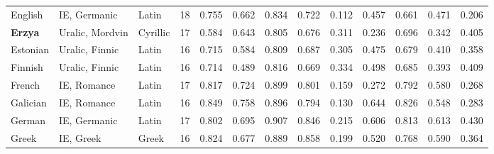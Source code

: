 \begin{tabular}{lllrrrrrrrrrr}
                        English &                    IE, Germanic &                 Latin &        18 &                       0.755 &                         0.662 &         0.834 &                  0.722 &            0.112 &                         0.457 &         0.661 &                  0.471 &            0.206 \\
                 \textbf{Erzya} &                 Uralic, Mordvin &              Cyrillic &        17 &                       0.584 &                         0.643 &         0.805 &                  0.676 &            0.311 &                         0.236 &         0.696 &                  0.342 &            0.405 \\
                       Estonian &                  Uralic, Finnic &                 Latin &        16 &                       0.715 &                         0.584 &         0.809 &                  0.687 &            0.305 &                         0.475 &         0.679 &                  0.410 &            0.358 \\
                        Finnish &                  Uralic, Finnic &                 Latin &        16 &                       0.714 &                         0.489 &         0.816 &                  0.669 &            0.334 &                         0.498 &         0.685 &                  0.393 &            0.409 \\
                         French &                     IE, Romance &                 Latin &        17 &                       0.817 &                         0.724 &         0.899 &                  0.801 &            0.159 &                         0.272 &         0.792 &                  0.580 &            0.268 \\
                       Galician &                     IE, Romance &                 Latin &        16 &                       0.849 &                         0.758 &         0.896 &                  0.794 &            0.130 &                         0.644 &         0.826 &                  0.548 &            0.283 \\
                         German &                    IE, Germanic &                 Latin &        17 &                       0.802 &                         0.695 &         0.907 &                  0.846 &            0.215 &                         0.606 &         0.813 &                  0.613 &            0.430 \\
                          Greek &                       IE, Greek &                 Greek &        16 &                       0.824 &                         0.677 &         0.889 &                  0.858 &            0.199 &                         0.520 &         0.768 &                  0.590 &            0.364 \\

\end{tabular}
